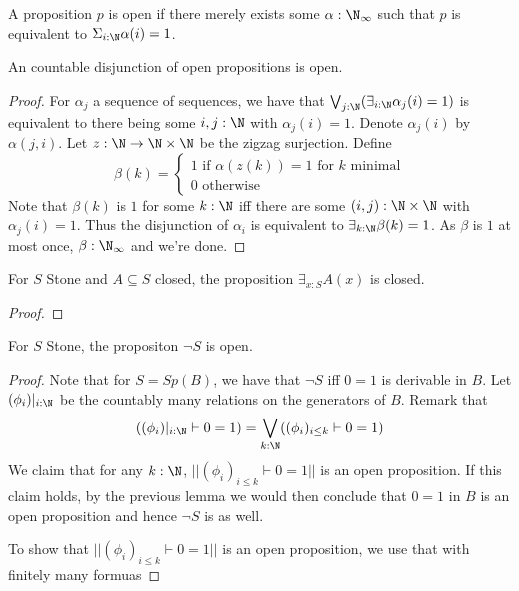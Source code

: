 \begin{definition}
  A proposition $p$ is open if there merely exists some $\alpha:\N_\infty$ such that 
  $p$ is equivalent to $\Sigma_{i:\N} \alpha(i) = 1$. 
\end{definition}
\begin{lemma}
  An countable disjunction of open propositions is open. 
\end{lemma}
\begin{proof}
  For $\alpha_j$ a sequence of sequences, 
  we have that $\bigvee_{j:\N}(\exists_{i:\N} \alpha_j(i) = 1)$ 
  is equivalent to there being some $i,j:\N$ with $\alpha_j(i) = 1$. 
  Denote $\alpha_j(i)$ by $\alpha(j,i)$. 
  Let $z:\N \to \N \times \N$ be the zigzag surjection. 
  Define 
  \begin{equation}
    \beta(k) = 
    \begin{cases}
      1 \text{ if } \alpha(z(k)) = 1\text{ for $k$ minimal}\\
      0 \text{ otherwise} 
    \end{cases}
  \end{equation}
  Note that $\beta(k)$ is $1$ for some $k:\N$ iff there are some $(i,j):\N \times \N$ 
  with $\alpha_j(i) = 1$. 
  Thus the disjunction of $\alpha_i$ is equivalent to 
  $\exists_{k:\N} \beta(k) = 1$. 
  As $\beta$ is $1$ at most once, $\beta:\N_\infty$ and we're done. 
\end{proof}




\begin{lemma}
  For $S$ Stone and $A\subseteq S$ closed, 
  the proposition $\exists_{x:S} A(x)$ is closed. 
\end{lemma}
\begin{proof}
  
\end{proof}




\begin{lemma}
  For $S$ Stone, the propositon $\neg S$ is open. 
\end{lemma}

\begin{proof}
  Note that for $S = Sp(B)$, we have that $\neg S$ iff $0=1$ is derivable in $B$. 
  Let $(\phi_i)|_{i:\N}$ be the countably many relations on the generators of $B$. 
  Remark that 
  \begin{equation}
    ((\phi_i)|_{i:\N} \vdash 0 = 1 )= \bigvee_{k:\N} ((\phi_i)_{i\leq k} \vdash 0 = 1)
  \end{equation}
  We claim that for any $k:\N$, $||(\phi_i)_{i\leq k} \vdash 0 = 1||$ is an open proposition. 
  If this claim holds, by the previous lemma we would then conclude that $0=1$ in $B$ is an open proposition
  and hence $\neg S$ is as well. 

  To show that $||(\phi_i)_{i\leq k} \vdash 0 = 1||$ is an open proposition, 
  we use that with finitely many formuas


\end{proof}
